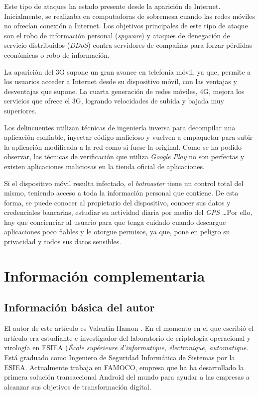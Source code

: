 \documentclass[a4paper,11pt]{report}
\begin{document}
Este tipo de ataques ha estado presente desde la aparición de Internet. Inicialmente, se realizaba en computadoras de sobremesa cuando las redes móviles no ofrecían conexión a Internet. Los objetivos principales de este tipo de ataque son el robo de información personal (\emph{spyware}) y ataques de denegación de servicio distribuidos (\emph{DDoS}) contra servidores de compañías para forzar pérdidas económicas o robo de información.

La aparición del 3G supone un gran avance en telefonía móvil, ya que, permite a los usuarios acceder a Internet desde su dispositivo móvil, con las ventajas y desventajas que supone. La cuarta generación de redes móviles, 4G, mejora los servicios que ofrece el 3G, logrando velocidades de subida y bajada muy superiores.

Los delincuentes utilizan técnicas de ingeniería inversa para decompilar una aplicación confiable, inyectar código malicioso y vuelven a empaquetar para subir la aplicación modificada a la red como si fuese la original. Como se ha podido observar, las técnicas de verificación que utiliza \emph{Google Play} no son perfectas y existen aplicaciones maliciosas en la tienda oficial de aplicaciones. 

Si el dispositivo móvil resulta infectado, el \emph{botmaster} tiene un control total del mismo, teniendo acceso a toda la información personal que contiene. De esta forma, se puede conocer al propietario del dispositivo, conocer sus datos y credenciales bancarias, estudiar su actividad diaria por medio del \emph{GPS} \ldots Por ello, hay que concienciar al usuario para que tenga cuidado cuando descargue aplicaciones poco fiables y le otorgue  permisos, ya que, pone en peligro su privacidad y todos sus datos sensibles.







\appendix

\chapter{Información complementaria}
\section{Información básica del autor}\label{autor}
El autor de este artículo es Valentin Hamon \cite{Autor}. En el momento en el que escribió el artículo era estudiante e investigador del laboratorio de criptologia operacional y virología en ESIEA\cite{ESIEA} (\emph{École supérieure d'informatique, électronique, automatique}. Está graduado como Ingeniero de Seguridad Informática de Sistemas por la ESIEA. Actualmente trabaja en FAMOCO, empresa que ha ha desarrollado la primera solución transaccional Android del mundo para ayudar a las empresas a alcanzar sus objetivos de transformación digital.
\end{document}
